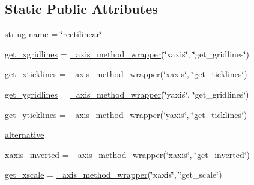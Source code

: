 \subsection*{Static Public Attributes}
\begin{DoxyCompactItemize}
\item 
string \hyperlink{classmatplotlib_1_1axes_1_1__base_1_1__AxesBase_a27c0126a64d380b6aead4f7d2b68e801}{name} = \char`\"{}rectilinear\char`\"{}
\item 
\hyperlink{classmatplotlib_1_1axes_1_1__base_1_1__AxesBase_a965a1dd0880f517c22bdaa1e7f83780c}{get\+\_\+xgridlines} = \hyperlink{classmatplotlib_1_1axes_1_1__base_1_1__axis__method__wrapper}{\+\_\+axis\+\_\+method\+\_\+wrapper}(\char`\"{}xaxis\char`\"{}, \char`\"{}get\+\_\+gridlines\char`\"{})
\item 
\hyperlink{classmatplotlib_1_1axes_1_1__base_1_1__AxesBase_adb58dc3946eb33fd04ce12d30e73ae7b}{get\+\_\+xticklines} = \hyperlink{classmatplotlib_1_1axes_1_1__base_1_1__axis__method__wrapper}{\+\_\+axis\+\_\+method\+\_\+wrapper}(\char`\"{}xaxis\char`\"{}, \char`\"{}get\+\_\+ticklines\char`\"{})
\item 
\hyperlink{classmatplotlib_1_1axes_1_1__base_1_1__AxesBase_aa7e7064863844d965b00dd242574c482}{get\+\_\+ygridlines} = \hyperlink{classmatplotlib_1_1axes_1_1__base_1_1__axis__method__wrapper}{\+\_\+axis\+\_\+method\+\_\+wrapper}(\char`\"{}yaxis\char`\"{}, \char`\"{}get\+\_\+gridlines\char`\"{})
\item 
\hyperlink{classmatplotlib_1_1axes_1_1__base_1_1__AxesBase_a488d6b89b0aef3960f870dbdf428e323}{get\+\_\+yticklines} = \hyperlink{classmatplotlib_1_1axes_1_1__base_1_1__axis__method__wrapper}{\+\_\+axis\+\_\+method\+\_\+wrapper}(\char`\"{}yaxis\char`\"{}, \char`\"{}get\+\_\+ticklines\char`\"{})
\item 
\hyperlink{classmatplotlib_1_1axes_1_1__base_1_1__AxesBase_a44776bfe591f3196a134cc6d8364a09e}{alternative}
\item 
\hyperlink{classmatplotlib_1_1axes_1_1__base_1_1__AxesBase_a39bc6f82e966561e916c422b45227f84}{xaxis\+\_\+inverted} = \hyperlink{classmatplotlib_1_1axes_1_1__base_1_1__axis__method__wrapper}{\+\_\+axis\+\_\+method\+\_\+wrapper}(\char`\"{}xaxis\char`\"{}, \char`\"{}get\+\_\+inverted\char`\"{})
\item 
\hyperlink{classmatplotlib_1_1axes_1_1__base_1_1__AxesBase_a71ce0aea52a815e3657d36e37e3fb0fe}{get\+\_\+xscale} = \hyperlink{classmatplotlib_1_1axes_1_1__base_1_1__axis__method__wrapper}{\+\_\+axis\+\_\+method\+\_\+wrapper}(\char`\"{}xaxis\char`\"{}, \char`\"{}get\+\_\+scale\char`\"{})

\end{DoxyCompactItemize}

